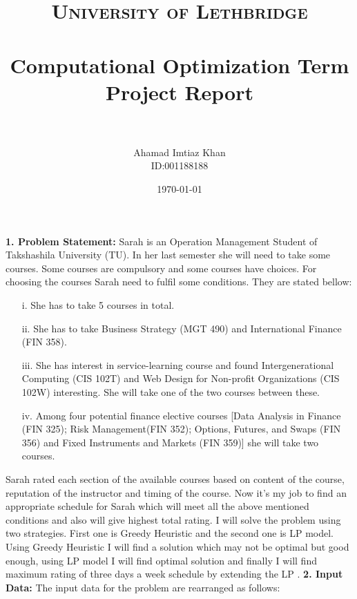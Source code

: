 \documentclass[paper=letter, fontsize=11pt]{scrartcl} %
\title{	
\normalfont \normalsize 
\textsc{University of Lethbridge} \\ [25pt] %
\horrule{0.5pt} \\[0.4cm] %
\huge Computational Optimization Term Project Report\\ %
\horrule{2pt} \\[0.5cm] %
}
\author{Ahamad Imtiaz Khan\\ID:001188188} %
\date{\normalsize\today} %
\begin{document}
\maketitle %



\Large \textbf{1. Problem Statement:}
\normalsize Sarah is an Operation Management Student of Takshashila University (TU). In her 
last semester she will need to take some courses. Some courses are compulsory and some courses have choices.
For choosing the courses Sarah need to fulfil some conditions. They are stated  bellow:
    
\begin{enumerate} [align=left,style=nextline,leftmargin=1.5cm,labelsep=\parindent,font=\normalfont]
\item[i.] She has to take 5 courses in total.
\item[ii.] She has to take Business Strategy (MGT 490) and International Finance (FIN 358).
\item[iii.] She has interest in service-learning course and found Intergenerational Computing (CIS 102T) and Web Design for Non-profit Organizations (CIS 102W) interesting. She will take one of the two courses 
between these.
\item[iv.] Among four potential finance elective courses [Data Analysis in Finance (FIN 325);
 Risk Management(FIN 352); Options, Futures, and Swaps (FIN 356) and 
Fixed Instruments and Markets (FIN 359)] she will take two courses.
\end{enumerate}

Sarah rated each section of the available courses based on content of the course, reputation of the instructor and timing of the course. Now it's my job to find an appropriate schedule for Sarah which will meet all the above mentioned conditions and also will give highest total rating. I will solve the problem using two strategies. First one is Greedy Heuristic and the second one is LP model. Using Greedy Heuristic I will find a solution which may not be optimal but good enough, using LP model I will find optimal solution and finally I will find maximum rating of three days a week schedule by extending the LP .
\newline
\newline
\Large \textbf{2. Input Data:}
\normalsize The input data for the problem are rearranged as follows: 
\end{document}
